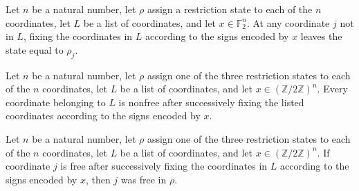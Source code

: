 \begin{theorem}
\label{FABL.CoordRestriction.fixCoordinateList_apply_of_not_mem}
\leanok
{}
Let $n$ be a natural number, let $\rho$ assign a restriction state to each of the $n$
coordinates, let $L$ be a list of coordinates, and let $x\in\mathbb{F}_2^n$. At any
coordinate $j$ not in $L$, fixing the coordinates in $L$ according to the signs encoded
by $x$ leaves the state equal to $\rho_j$.
\end{theorem}

\begin{theorem}
\label{FABL.CoordRestriction.fixCoordinateList_ne_free_of_mem}
\leanok
{}
Let $n$ be a natural number, let $\rho$ assign one of the three restriction states to
each of the $n$ coordinates, let $L$ be a list of coordinates, and let
$x\in(\mathbb{Z}/2\mathbb{Z})^n$. Every coordinate belonging to $L$ is nonfree after
successively fixing the listed coordinates according to the signs encoded by $x$.
\end{theorem}

\begin{theorem}
\label{FABL.CoordRestriction.fixCoordinateList_free_imp_original_free}
\leanok
{}
Let $n$ be a natural number, let $\rho$ assign one of the three restriction states to
each of the $n$ coordinates, let $L$ be a list of coordinates, and let
$x\in(\mathbb{Z}/2\mathbb{Z})^n$. If coordinate $j$ is free after successively fixing
the coordinates in $L$ according to the signs encoded by $x$, then $j$ was free in
$\rho$.
\end{theorem}

